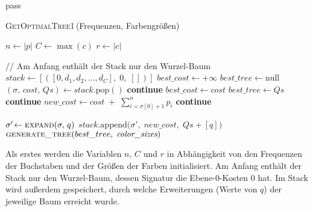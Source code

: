 pass\documentclass[a4paper,10pt,ngerman]{scrartcl}
\begin{document}
    \begin{algorithm} [H]
        \caption{\textsc{GetOptimalTree1}\,(Frequenzen, Farbengrößen)}
        \label{alg:optimal_tree}
        \begin{algorithmic}[1]
                \State $n \gets |p|$  
                \State $C \gets \max(c)$ 
                \State $r \gets |c|$  

                \State // Am Anfang enthält der Stack nur den Wurzel-Baum
                \State $stack \gets [([0, d_1, d_2, \dots, d_C],\;0,\;[])]$ 
                \State $best\_cost \gets +\infty$
                \State $best\_tree \gets \text{null}$
                    \State $(\sigma,\,cost,\,Qs) \gets stack.\mathrm{pop}()$
                        \State \textbf{continue}
                    \EndIf
                            \State $best\_cost \gets cost$
                            \State $best\_tree \gets Qs$
                        \EndIf
                        \State \textbf{continue}
                    \EndIf
                    \State $new\_cost \gets cost \;+\;\sum_{i=\sigma[0]+1}^{n} p_i$
                        \State \textbf{continue}
                    \EndIf


                        \State $\sigma'\!\gets \textsc{expand}(\sigma,\,q)$
                        \State $stack.\mathrm{append}\bigl(\sigma',\;new\_cost,\;Qs + [q]\bigr)$
                    \EndFor
                \EndWhile
                \State \Return $\textsc{generate\_tree}(best\_tree,\;\textit{color\_sizes})$
            \EndFunction
        \end{algorithmic}
    \end{algorithm}
    Als erstes werden die Variablen $n$, $C$ und $r$ in Abhängigkeit von den Frequenzen der Buchstaben und der Größen der Farben initialisiert.
    Am Anfang enthält der Stack nur den Wurzel-Baum, dessen Signatur die Ebene-0-Kosten 0 hat.
    Im Stack wird außerdem gespeichert, durch welche Erweiterungen (Werte von $q$) der jeweilige Baum erreicht wurde.
\end{document}

